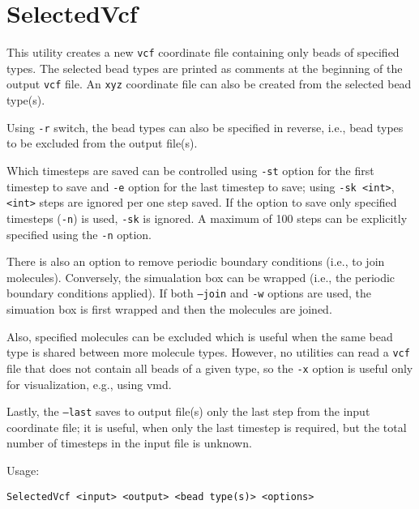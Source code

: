 \section{SelectedVcf} \label{sec:SelectedVcf}

This utility creates a new \texttt{vcf} coordinate file containing only
beads of specified types. The selected bead
types are printed as comments at the beginning of the output \texttt{vcf}
file.
An \texttt{xyz} coordinate file can also be created from the selected
bead type(s).

Using \texttt{-r} switch, the bead types can also be specified in reverse,
i.e., bead types to be excluded from the output file(s).

Which timesteps are saved can be controlled using \texttt{-st} option for
the first timestep to save and \texttt{-e} option for the last timestep to
save; using \texttt{-sk <int>}, \texttt{<int>} steps are ignored per one
step saved. If the option to save only specified timesteps (\texttt{-n}) is
used, \texttt{-sk} is ignored. A maximum of 100 steps can be explicitly
specified using the \texttt{-n} option.

There is also an option to remove periodic boundary conditions (i.e., to join
molecules). Conversely, the simualation box can be wrapped (i.e., the
periodic boundary conditions applied). If both \texttt{--join} and
\texttt{-w} options are used, the simuation box is first wrapped and then
the molecules are joined.

Also, specified molecules can be excluded which is useful when the same
bead type is shared between more molecule types. However, no utilities can
read a \texttt{vcf} file that does not contain all beads of a given type,
so the \texttt{-x} option is useful only for visualization, e.g., using
vmd.

Lastly, the \texttt{--last} saves to output file(s) only the last step from
the input coordinate file; it is useful, when only the last timestep is
required, but the total number of timesteps in the input file is unknown.

Usage:

\vspace{1em}
\noindent
\texttt{SelectedVcf <input> <output> <bead type(s)> <options>}

